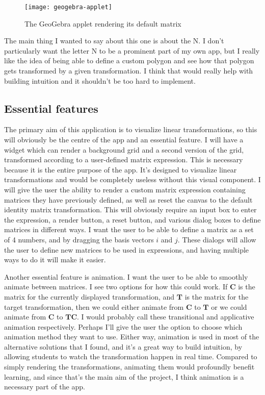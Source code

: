 \documentclass[../main.tex]{subfiles}
\begin{document}
\begin{figure}[h]
	\centering
	\texttt{[image: geogebra-applet]}
	\caption{The GeoGebra applet rendering its default matrix}
	\label{fig:geogebra-applet}
\end{figure}

The main thing I wanted to say about this one is about the N. I don't particularly want the letter N to be a prominent part of my own app, but I really like the idea of being able to define a custom polygon and see how that polygon gets transformed by a given transformation. I think that would really help with building intuition and it shouldn't be too hard to implement.

\subsection{Essential features}

The primary aim of this application is to visualize linear transformations, so this will obviously be the centre of the app and an essential feature. I will have a widget which can render a background grid and a second version of the grid, transformed according to a user-defined matrix expression. This is necessary because it is the entire purpose of the app. It's designed to visualize linear transformations and would be completely useless without this visual component. I will give the user the ability to render a custom matrix expression containing matrices they have previously defined, as well as reset the canvas to the default identity matrix transformation. This will obviously require an input box to enter the expression, a render button, a reset button, and various dialog boxes to define matrices in different ways. I want the user to be able to define a matrix as a set of 4 numbers, and by dragging the basis vectors $i$ and $j$. These dialogs will allow the user to define new matrices to be used in expressions, and having multiple ways to do it will make it easier.

Another essential feature is animation. I want the user to be able to smoothly animate between matrices. I see two options for how this could work. If $\mathbf{C}$ is the matrix for the currently displayed transformation, and $\mathbf{T}$ is the matrix for the target transformation, then we could either animate from $\mathbf{C}$ to $\mathbf{T}$ or we could animate from $\mathbf{C}$ to $\mathbf{TC}$. I would probably call these transitional and applicative animation respectively. Perhaps I'll give the user the option to choose which animation method they want to use. Either way, animation is used in most of the alternative solutions that I found, and it's a great way to build intuition, by allowing students to watch the transformation happen in real time. Compared to simply rendering the transformations, animating them would profoundly benefit learning, and since that's the main aim of the project, I think animation is a necessary part of the app.
\end{document}
